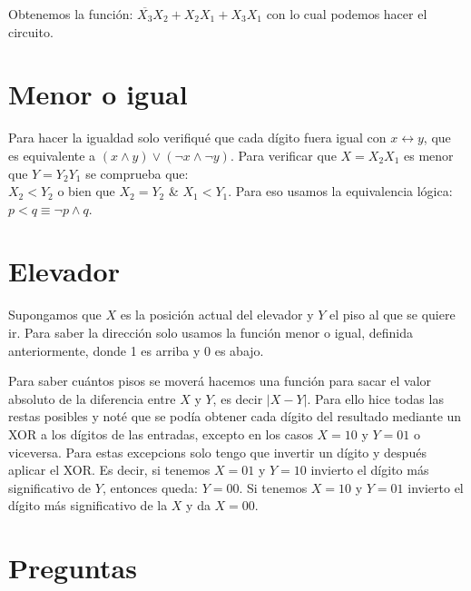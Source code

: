 \documentclass{article}
\begin{document}
Obtenemos la función: $\overline{X_{3}}X_{2}+X_{2}X_{1}+X_{3}X_{1}$ con lo cual podemos hacer el circuito.

\section{Menor o igual}

Para hacer la igualdad solo verifiqué que cada dígito fuera igual con $x \leftrightarrow y$, que es equivalente a $(x \wedge y) \vee (\lnot x \wedge \lnot y)$.
Para verificar que $X=X_{2}X_{1}$ es menor que $Y=Y_{2}Y_{1}$ se comprueba que: \\
$X_{2} < Y_{2}$ o bien que $X_{2} = Y_{2}$ \& $X_{1} < Y_{1}$. Para eso usamos la equivalencia lógica:
$p<q \equiv \lnot p \wedge q$.

\section{Elevador}

Supongamos que $X$ es la posición actual del elevador y $Y$ el piso al que se quiere ir. Para saber la dirección solo usamos la función menor o igual, definida anteriormente, donde 1 es arriba y 0 es abajo.

Para saber cuántos pisos se moverá hacemos una función para sacar el valor absoluto de la diferencia entre $X$ y $Y$, es decir $|X-Y|$. Para ello hice todas las restas posibles y noté que se podía obtener cada dígito del resultado mediante un XOR a los dígitos de las entradas, excepto en los casos $X=10$ y $Y=01$ o viceversa. Para estas excepcions solo tengo que invertir un dígito y después aplicar el XOR. Es decir, si tenemos $X=01$ y $Y=10$ invierto el dígito más significativo de $Y$, entonces queda: $Y=00$. Si tenemos $X=10$ y $Y=01$ invierto el dígito más significativo de la $X$ y da $X=00$.

\section{Preguntas}
\end{document}

